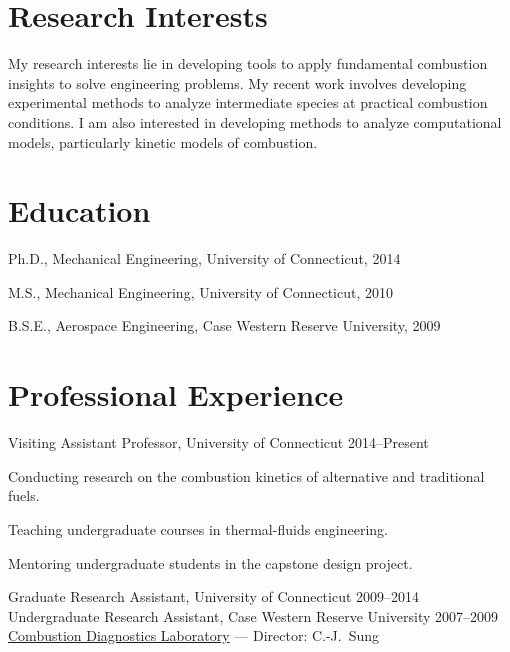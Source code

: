 \section{{\sectionfont Research Interests}}

My research interests lie in developing tools to apply fundamental
combustion insights to solve engineering problems. My recent work
involves developing experimental methods to analyze intermediate species
at practical combustion conditions. I am also interested in developing
methods to analyze computational models, particularly kinetic models of
combustion.

\section{{\sectionfont Education}}

Ph.D., Mechanical Engineering, University of Connecticut, 2014

M.S., Mechanical Engineering, University of Connecticut, 2010

B.S.E., Aerospace Engineering, Case Western Reserve University, 2009

\section{{\sectionfont Professional Experience}}

Visiting Assistant Professor, University of Connecticut \hfill 2014--Present

\begin{innerlist}
\item[] Conducting research on the combustion kinetics of alternative and traditional fuels.
\item[] Teaching undergraduate courses in thermal-fluids engineering.
\item[] Mentoring undergraduate students in the capstone design project.
\end{innerlist}

\vspace{\baselineskip}

Graduate Research Assistant, University of Connecticut \hfill 2009--2014\\
Undergraduate Research Assistant, Case Western Reserve University \hfill 2007--2009\\
\href{http://combdiaglab.engr.uconn.edu}{Combustion Diagnostics Laboratory} --- Director: C.-J.\ Sung

